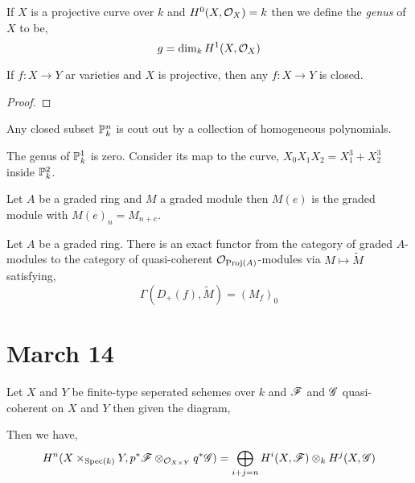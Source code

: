 \documentclass[12pt]{article}
\begin{document}
\renewcommand{\C}{\mathcal{C}}

\begin{definition}
If $X$ is a projective curve over $k$ and $H^0(X, \struct{X}) = k$ then we define the \textit{genus} of $X$ to be,
\[ g = \dim_k H^1(X, \struct{X}) \]  
\end{definition}

\begin{lemma}
If $f : X \to Y$ ar varieties and $X$ is projective, then any $f : X \to Y$ is closed. 
\end{lemma}

\begin{proof}

\end{proof}

\begin{proposition}
Any closed subset $\P^n_k$ is cout out by a collection of homogeneous polynomials. 
\end{proposition}

\begin{example}
The genus of $\P^1_k$ is zero. Consider its map to the curve, $X_0 X_1 X_2 = X_1^3 + X_2^3$ inside $\P^2_k$. 
\end{example}

\begin{definition}
Let $A$ be a graded ring and $M$ a graded module then $M(e)$ is the graded module with $M(e)_n = M_{n + e}$. 
\end{definition}

\begin{proposition}
Let $A$ be a graded ring. There is an exact functor from the category of graded $A$-modules to the category of quasi-coherent $\struct{\Proj{A}}$-modules via $M \mapsto \widetilde{M}$ satisfying,
\[ \Gamma(D_+(f), \widetilde{M}) = (M_f)_0 \]
\end{proposition}

\section{March 14}

\begin{proposition}[Kunneth]
Let $X$ and $Y$ be finite-type seperated schemes over $k$ and $\F$ and $\G$ quasi-coherent on $X$ and $Y$ then given the diagram,
\begin{center}
\end{center}
Then we have,
\[ H^n(X \times_{\Spec{k}} Y, p^* \F \otimes_{\struct{X \times Y}} q^* \G) = \bigoplus_{i + j = n} H^i(X, \F) \otimes_k H^j(X, \G) \]
\end{proposition}
\end{document}
